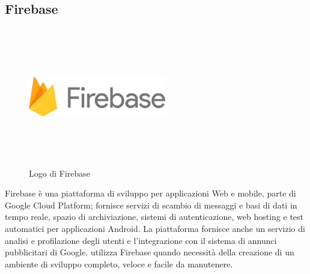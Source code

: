    \subsection{Firebase}
   \begin{figure}[htbp]
      \begin{center}
         \includegraphics[width=6cm,height=6cm,keepaspectratio]{immagini/firebase-logo}
      \end{center}
      \caption{Logo di Firebase}
   \end{figure}
   Firebase è una piattaforma di sviluppo per applicazioni Web e mobile, parte di Google Cloud Platform; fornisce servizi di scambio di messaggi e basi di dati in tempo reale, spazio di archiviazione, sistemi di autenticazione, web hosting e test automatici per applicazioni Android. La piattaforma fornisce anche un servizio di analisi e profilazione degli utenti e l'integrazione con il sistema di annunci pubblicitari di Google.
   \nomeAzienda{} utilizza Firebase quando necessità della creazione di un ambiente di sviluppo completo, veloce e facile da manutenere.


